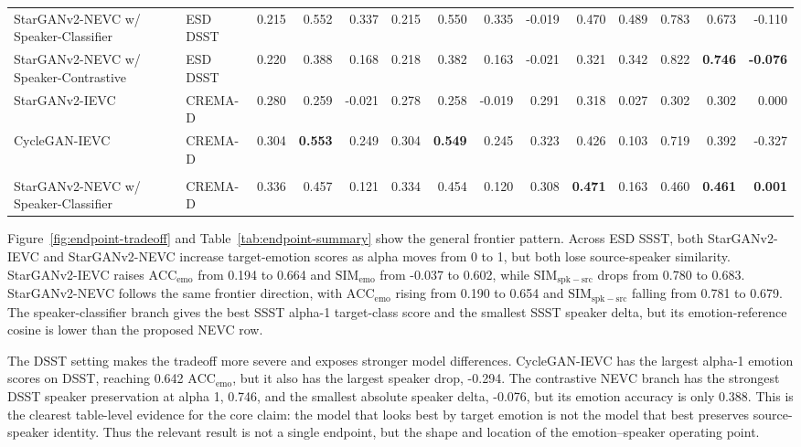\begin{table}[t]
{\begin{tabular}{ll*{12}{r}}
StarGANv2-NEVC w/ Speaker-Classifier & ESD DSST & 0.215 & 0.552 & 0.337 & 0.215 & 0.550 & 0.335 & -0.019 & 0.470 & 0.489 & 0.783 & 0.673 & -0.110 \\
StarGANv2-NEVC w/ Speaker-Contrastive & ESD DSST & 0.220 & 0.388 & 0.168 & 0.218 & 0.382 & 0.163 & -0.021 & 0.321 & 0.342 & 0.822 & \textbf{0.746} & \textbf{-0.076} \\
\midrule
StarGANv2-IEVC & CREMA-D & 0.280 & 0.259 & -0.021 & 0.278 & 0.258 & -0.019 & 0.291 & 0.318 & 0.027 & 0.302 & 0.302 & 0.000 \\
CycleGAN-IEVC & CREMA-D & 0.304 & \textbf{0.553} & 0.249 & 0.304 & \textbf{0.549} & 0.245 & 0.323 & 0.426 & 0.103 & 0.719 & 0.392 & -0.327 \\
\\
StarGANv2-NEVC w/ Speaker-Classifier & CREMA-D & 0.336 & 0.457 & 0.121 & 0.334 & 0.454 & 0.120 & 0.308 & \textbf{0.471} & 0.163 & 0.460 & \textbf{0.461} & \textbf{0.001} \\

\bottomrule
\end{tabular}
}
\end{table}

Figure~\ref{fig:endpoint-tradeoff} and Table~\ref{tab:endpoint-summary} show the general frontier pattern.
Across ESD SSST, both StarGANv2-IEVC and StarGANv2-NEVC increase target-emotion scores as alpha moves from 0 to 1, but both lose source-speaker similarity.
StarGANv2-IEVC raises $\mathrm{ACC}_{\mathrm{emo}}$ from 0.194 to 0.664 and $\mathrm{SIM}_{\mathrm{emo}}$ from -0.037 to 0.602, while $\mathrm{SIM}_{\mathrm{spk-src}}$ drops from 0.780 to 0.683.
StarGANv2-NEVC follows the same frontier direction, with $\mathrm{ACC}_{\mathrm{emo}}$ rising from 0.190 to 0.654 and $\mathrm{SIM}_{\mathrm{spk-src}}$ falling from 0.781 to 0.679.
The speaker-classifier branch gives the best SSST alpha-1 target-class score and the smallest SSST speaker delta, but its emotion-reference cosine is lower than the proposed NEVC row.

The DSST setting makes the tradeoff more severe and exposes stronger model differences.
CycleGAN-IEVC has the largest alpha-1 emotion scores on DSST, reaching 0.642 $\mathrm{ACC}_{\mathrm{emo}}$, but it also has the largest speaker drop, -0.294.
The contrastive NEVC branch has the strongest DSST speaker preservation at alpha 1, 0.746, and the smallest absolute speaker delta, -0.076, but its emotion accuracy is only 0.388.
This is the clearest table-level evidence for the core claim: the model that looks best by target emotion is not the model that best preserves source-speaker identity.
Thus the relevant result is not a single endpoint, but the shape and location of the emotion--speaker operating point.

